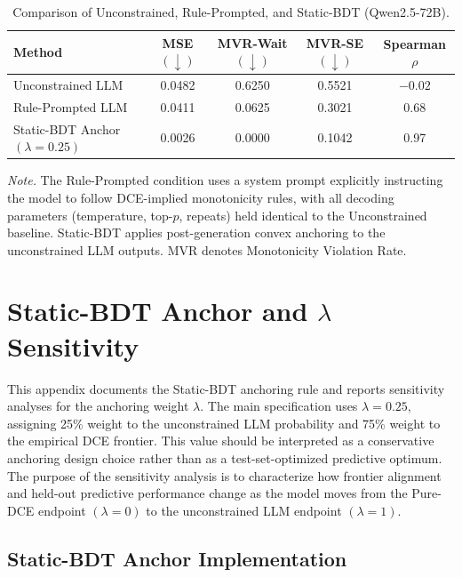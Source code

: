 \documentclass[11pt]{article}
\begin{document}
\begin{table}[h]
\centering
\caption{Comparison of Unconstrained, Rule-Prompted, and Static-BDT (Qwen2.5-72B).}
\label{tab:rule_prompted_comparison}
\small
\begin{tabular}{l c c c c}
\toprule
\textbf{Method} & \textbf{MSE $(\downarrow)$} & \textbf{MVR-Wait $(\downarrow)$} & \textbf{MVR-SE $(\downarrow)$} & \textbf{Spearman $\rho$} \\
\midrule
Unconstrained LLM & 0.0482 & 0.6250 & 0.5521 & $-0.02$ \\
Rule-Prompted LLM & 0.0411 & 0.0625 & 0.3021 & 0.68 \\
Static-BDT Anchor $(\lambda=0.25)$ & 0.0026 & 0.0000 & 0.1042 & 0.97 \\
\bottomrule
\end{tabular}
\vspace{0.4em}
\begin{minipage}{0.95\textwidth}
\small
\textit{Note.} The Rule-Prompted condition uses a system prompt explicitly instructing the model to follow DCE-implied monotonicity rules, with all decoding parameters (temperature, top-$p$, repeats) held identical to the Unconstrained baseline. Static-BDT applies post-generation convex anchoring to the unconstrained LLM outputs. MVR denotes Monotonicity Violation Rate.
\end{minipage}
\end{table}

\section{Static-BDT Anchor and \texorpdfstring{\(\lambda\)}{lambda} Sensitivity}
\label{app:lambda}

This appendix documents the Static-BDT anchoring rule and reports sensitivity analyses for the anchoring weight \(\lambda\). The main specification uses \(\lambda=0.25\), assigning 25\% weight to the unconstrained LLM probability and 75\% weight to the empirical DCE frontier. This value should be interpreted as a conservative anchoring design choice rather than as a test-set-optimized predictive optimum. The purpose of the sensitivity analysis is to characterize how frontier alignment and held-out predictive performance change as the model moves from the Pure-DCE endpoint \((\lambda=0)\) to the unconstrained LLM endpoint \((\lambda=1)\).

\subsection{Static-BDT Anchor Implementation}
\end{document}
